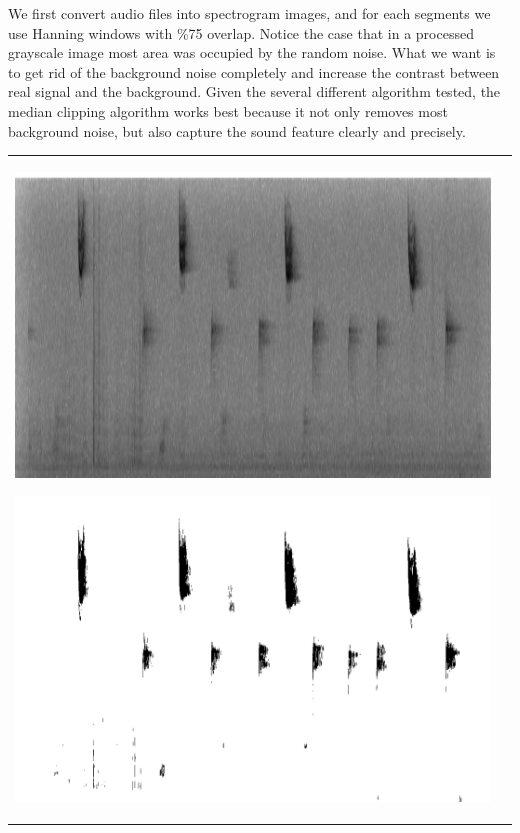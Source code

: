 We first convert audio files into spectrogram images, and for each segments we use Hanning windows with \%75 overlap. Notice the case that in a processed grayscale image most area was occupied by the random noise. What we want is to get rid of the background noise completely and increase the contrast between real signal and the background. Given the several different algorithm tested, the median clipping algorithm works best because it not only removes most background noise, but also capture the sound feature clearly and precisely.

\begin{center}
\begin{tabular}{cc}
\begin{minipage}{1.5truein}
\includegraphics[height=1truein]{images/original}
\end{minipage}
\begin{minipage}{1.5truein}
\includegraphics[height=1truein]{images/Median_clipped}

\end{minipage}
\end{tabular}
\end{center}
